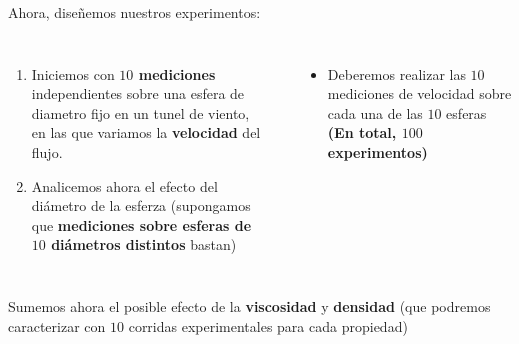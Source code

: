 \documentclass[t]{beamer}
\begin{document}
\begin{frame}
Ahora, diseñemos nuestros experimentos:
\begin{small}

\begin{columns}[c]
\begin{enumerate}
\justifying
\item Iniciemos con \textbf{$10$ mediciones} independientes sobre una esfera de diametro fijo en un tunel de viento, en las que variamos la  \textbf{velocidad} del flujo.
\item Analicemos ahora el efecto del diámetro de la esferza (supongamos que \textbf{mediciones sobre esferas de $10$ diámetros distintos} bastan)
\end{enumerate}
\textbf{\color{red}{¿Existe un efecto cruzado entre diámetro y velocidad?}}
\begin{itemize}
\item Deberemos realizar las $10$ mediciones de velocidad sobre cada una de las $10$ esferas \textbf{(En total, $100$ experimentos)}
\end{itemize}
\end{columns}
\vspace{0.2cm}

Sumemos ahora el posible efecto de la \textbf{viscosidad} y \textbf{densidad} (que podremos caracterizar con $10$ corridas experimentales para cada propiedad)
\end{small}
\vspace{0.5cm}

{}
\end{frame}
\end{document}
